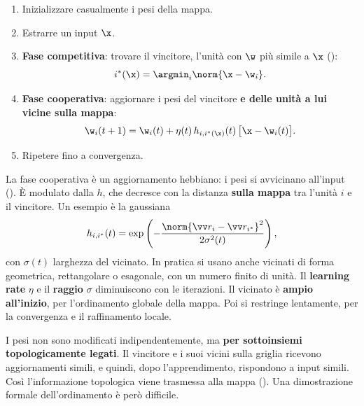 \begin{algoritmo}[SOM]
\begin{enumerate}
  \item Inizializzare casualmente i pesi della mappa.
  \item Estrarre un input $\x$.
  \item \textbf{Fase competitiva}: trovare il vincitore, l'unità con $\w$ più simile a $\x$ ():
        \[
        i^*(\x) = \argmin_i\norm{\x-\w_i}.
        \]
  \item \textbf{Fase cooperativa}: aggiornare i pesi del vincitore \textbf{e delle unità a lui vicine sulla mappa}:
        \begin{equation}\label{eq:som}
        \w_i(t+1) = \w_i(t) + \eta(t)\,h_{i,i^*(\x)}(t)\,\big[\x-\w_i(t)\big].
        \end{equation}
  \item Ripetere fino a convergenza.
\end{enumerate}
\end{algoritmo}

La fase cooperativa è un aggiornamento hebbiano: i pesi si avvicinano all'input (). È modulato
dalla  $h$, che decresce con la distanza \textbf{sulla mappa} tra l'unità $i$ e il
vincitore. Un esempio è la gaussiana
\[
h_{i,i^*}(t) = \exp\left(-\frac{\norm{\vv r_i-\vv r_{i^*}}^2}{2\sigma^2(t)}\right),
\]
con $\sigma(t)$ larghezza del vicinato. In pratica si usano anche vicinati di forma geometrica, rettangolare o
esagonale, con un numero finito di unità. Il \textbf{learning rate} $\eta$ e il \textbf{raggio} $\sigma$
diminuiscono con le iterazioni. Il vicinato è \textbf{ampio all'inizio}, per l'ordinamento globale della mappa. Poi
si restringe lentamente, per la convergenza e il raffinamento locale.

\begin{idea}
I pesi non sono modificati indipendentemente, ma \textbf{per sottoinsiemi topologicamente legati}. Il vincitore e i
suoi vicini sulla griglia ricevono aggiornamenti simili, e quindi, dopo l'apprendimento, rispondono a input
simili. Così l'informazione topologica viene trasmessa alla mappa (). Una dimostrazione
formale dell'ordinamento è però difficile.
\end{idea}

